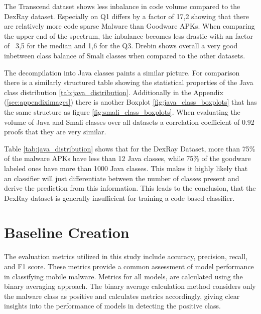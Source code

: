 The Transcend dataset shows less inbalance in code volume compared to the DexRay dataset.
Especially on Q1 differs by a factor of 17,2 showing that there are relatively more code sparse Malware than Goodware APKs.
When comparing the upper end of the spectrum, the inbalance becomes less drastic with an factor of ~3,5 for the median and 1,6 for the Q3.
Drebin shows overall a very good inbetween class balance of Smali classes when compared to the other datasets.

The decompilation into Java classes paints a similar picture. 
For comparison there is a similarly structured table showing the statistical properties of the Java class distribution \ref{tab:java_distribution}.
Additionally in the Appendix (\ref{sec:appendiximages}) there is another Boxplot \ref{fig:java_class_boxplots} that has the same 
structure as figure \ref{fig:smali_class_boxplots}.
When evaluating the volume of Java and Smali classes over all datasets a correlation coefficient of 0.92 proofs that they are very similar.

Table \ref{tab:java_distribution} shows that for the DexRay Dataset, more than 75\% of the malware APKs have less than 12 Java classes, 
while 75\%  of the goodware labeled ones have more than 1000 Java classes.
This makes it highly likely that an classifier will just differentiate 
between the number of classes present and derive the prediction from this information.
This leads to the conclusion, that the DexRay dataset is generally insufficient for training a code based classifier.


\section{Baseline Creation}
\label{sec:baseline}

The evaluation metrics utilized in this study include 
accuracy, precision, recall, and F1 score. 
These metrics provide a common assessment of model performance in classifying mobile malware. 
Metrics for all models, are calculated using the binary averaging approach.
The binary average calculation method considers only the malware class as positive
and calculates metrics accordingly, giving clear insights into the performance of 
models in detecting the positive class.

